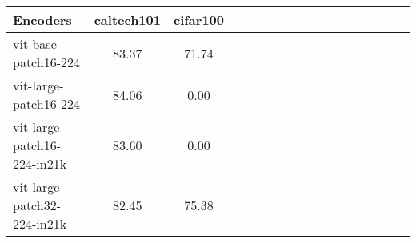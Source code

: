 \begin{tabular}{l cccccccccccccccc}
\toprule
Encoders & caltech101 & cifar100 \\ \hline  
vit-base-patch16-224 & 83.37 & 71.74\\
vit-large-patch16-224 & 84.06 & 0.00\\
vit-large-patch16-224-in21k & 83.60 & 0.00\\
vit-large-patch32-224-in21k & 82.45 & 75.38\\
\bottomrule
\end{tabular}
